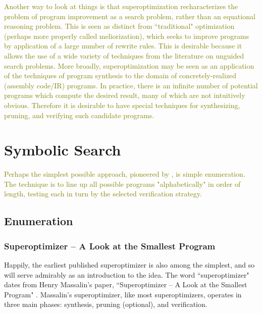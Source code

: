 \documentclass[12pt,twoside]{reedthesis}
\newcommand{\red}[1]{\textcolor{red}{#1}}
\newcommand{\green}[1]{\textcolor{olive}{#1}}
\begin{document}
    \green{
    Another way to look at things is that superoptimization recharacterizes the problem of program improvement as a search problem, rather than an equational reasoning problem.
    This is seen as distinct from ``traditional" optimization (perhaps more properly called meliorization), which seeks to improve programs by application of a large number of rewrite rules.
    This is desirable because it allows the use of a wide variety of techniques from the literature on unguided search problems.
    More broadly, superoptimization may be seen as an application of the techniques of program synthesis to the domain of concretely-realized (assembly code/IR) programs.
    In practice, there is an infinite number of potential programs which compute the desired result, many of which are not intuitively obvious.
    Therefore it is desirable to have special techniques for synthesizing, pruning, and verifying such candidate programs. 
    }

\chapter{Symbolic Search}
    \green{
    Perhaps the simplest possible approach, pioneered by \cite{massalin1987superoptimizer}, is simple enumeration. 
    The technique is to line up all possible programs "alphabetically" in order of length, testing each in turn by the selected verification strategy. 
    }
    \section{Enumeration}
        \subsection{Superoptimizer -- A Look at the Smallest Program}
            Happily, the earliest published superoptimizer is also among the simplest, and so will serve admirably as an introduction to the idea.
            The word ``superoptimizer" dates from Henry Massalin's paper, ``Superoptimizer -- A Look at the Smallest Program" \cite{massalin1987superoptimizer}.
            Massalin's superoptimizer, like most superoptimizers, operates in three main phases: synthesis, pruning (optional), and verification.
                
\end{document}
